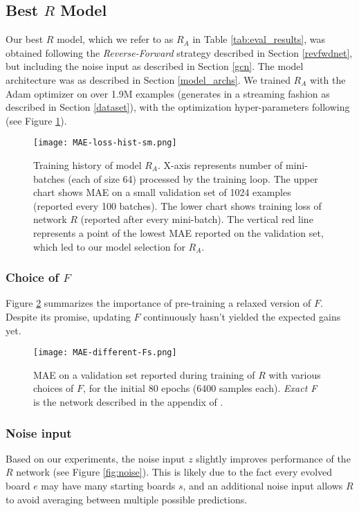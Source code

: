 \documentclass[conference]{IEEEtran}
\begin{document}
\subsection{Best $R$ Model}
Our best $R$ model, which we refer to as $R_A$ in Table \ref{tab:eval_results}, was obtained following the \emph{Reverse-Forward} strategy described in Section \ref{revfwdnet}, but including the noise input as described in Section \ref{gcn}. The model architecture was as described in Section \ref{model_archs}. We trained $R_A$ with the Adam optimizer \cite{kingma2017adam} on over 1.9M examples (generates in a streaming fashion as described in Section \ref{dataset}), with the optimization hyper-parameters following \cite{radford2016unsupervised} (see Figure \ref{fig:mae-loss}).

\begin{figure} %
    \centering
    \texttt{[image: MAE-loss-hist-sm.png]}
    \caption{Training history of model $R_A$. X-axis represents number of mini-batches (each of size 64) processed by the training loop. The upper chart shows MAE on a small validation set of 1024 examples (reported every 100 batches). The lower chart shows training loss of network $R$ (reported after every mini-batch). The vertical red line represents a point of the lowest MAE reported on the validation set, which led to our model selection for $R_A$.}
    \label{fig:mae-loss}
\end{figure}

\subsubsection{Choice of $F$} Figure \ref{fig:fwd_choices} summarizes the importance of pre-training a relaxed version of $F$. Despite its promise, updating $F$ continuously hasn't yielded the expected gains yet.

\begin{figure}
    \centering
    \texttt{[image: MAE-different-Fs.png]}
\caption{MAE on a validation set reported during training of $R$ with various choices of $F$, for the initial 80 epochs (6400 samples each). \emph{Exact F} is the network described in the appendix of \cite{springer2020its}.}
        \label{fig:fwd_choices}
\end{figure}

\subsubsection{Noise input}
Based on our experiments, the noise input $z$ slightly improves performance of the $R$ network (see Figure \ref{fig:noise}). This is likely due to the fact every evolved board $e$ may have many starting boards $s$, and an additional noise input allows $R$ to avoid averaging between multiple possible predictions.
\end{document}
